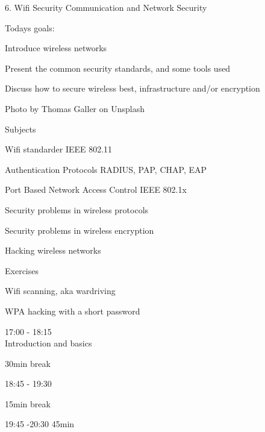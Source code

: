 \documentclass[Screen16to9,17pt]{foils}
\begin{document}
\mytitlepage
{6. Wifi Security}
{Communication and Network Security \the\year}




Todays goals:
\begin{list2}
\item Introduce wireless networks
\item Present the common security standards, and some tools used
\item Discuss how to secure wireless best, infrastructure and/or encryption
\end{list2}

Photo by Thomas Galler on Unsplash



\begin{list1}
\item Subjects
\begin{list2}
\item Wifi standarder IEEE 802.11
\item Authentication Protocols RADIUS, PAP, CHAP, EAP
\item Port Based Network Access Control IEEE 802.1x
\item Security problems in wireless protocols
\item Security problems in wireless encryption
\item Hacking wireless networks
\end{list2}
\item Exercises
\begin{list2}
\item Wifi scanning, aka wardriving
\item WPA hacking with a short password
\end{list2}
\end{list1}





\begin{list2}
\item 17:00 - 18:15\\
Introduction and basics
\item 30min break\\

\item 18:45 - 19:30\\

\item 15min break\\

\item 19:45 -20:30 45min\\
\end{list2}
\end{document}
